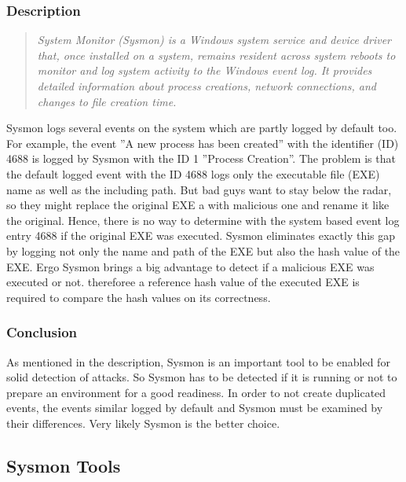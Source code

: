 \subsubsection{Description}
\begin{quotation}
    \textit{System Monitor (Sysmon) is a Windows system service and device driver that, once installed on a system, remains resident across system reboots to monitor and log system activity to the Windows event log. It provides detailed information about process creations, network connections, and changes to file creation time.\cite{Sysmon}}
\end{quotation}
Sysmon logs several events on the system which are partly logged by default too. For example, the event ''A new process has been created'' with the identifier (ID) 4688 is logged by Sysmon with the ID 1 ''Process Creation''. The problem is that the default logged event with the ID 4688 logs only the executable file (EXE) name as well as the including path. But bad guys want to stay below the radar, so they might replace the original EXE a with malicious one and rename it like the original. Hence, there is no way to determine with the system based event log entry 4688 if the original EXE was executed. Sysmon eliminates exactly this gap by logging not only the name and path of the EXE but also the hash value of the EXE. Ergo Sysmon brings a big advantage to detect if a malicious EXE was executed or not. thereforee a reference hash value of the executed EXE is required to compare the hash values on its correctness. \cite{Sysmon1}

\subsubsection{Conclusion}
As mentioned in the description, Sysmon is an important tool to be enabled for solid detection of attacks. So Sysmon has to be detected if it is running or not to prepare an environment for a good readiness. In order to not create duplicated events, the events similar logged by default and Sysmon must be examined by their differences. Very likely Sysmon is the better choice.


\subsection{Sysmon Tools}
